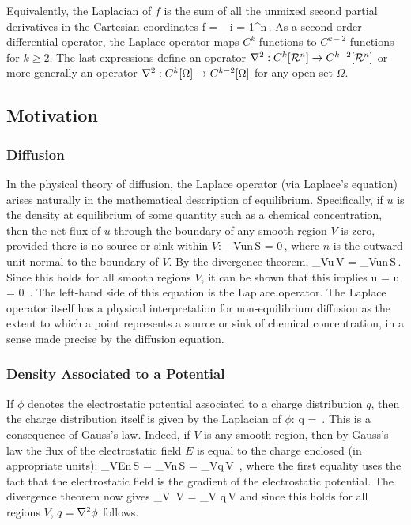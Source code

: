 Equivalently, the Laplacian of $f$ is the sum of all the unmixed second partial derivatives in the Cartesian coordinates  
\beq
\lder f = \sum_{i = 1}^{n}\,.
\eeq
As a second-order differential operator, the Laplace operator maps $C^k$-functions to $C^{k-2}$-functions for $k\geq 2$. The last expressions define an operator ${\nabla^2}:{C^k\!\left[{\mathcal{R}^{n}}\right]}\to{C^{k-2}\!\left[{\mathcal{R}^{n}}\right]}$ or more generally an operator ${\nabla^2}:{C^k\!\left[{\Omega}\right]}\to{C^{k-2}\!\left[{\Omega}\right]}$ for any open set $\Omega$.


\subsection{Motivation}

\subsubsection{Diffusion}
In the physical theory of diffusion, the Laplace operator (via Laplace's equation) arises naturally in the mathematical description of equilibrium. Specifically, if $u$ is the density at equilibrium of some quantity such as a chemical concentration, then the net flux of $u$ through the boundary of any smooth region $V$ is zero, provided there is no source or sink within $V$:
\beq
\int_{\bound V}\gder u\iprod n\,\dx S = 0\,,
\eeq
where $n$ is the outward unit normal to the boundary of $V$. By the divergence theorem,
\beq
\int_{V}\div\gder u\,\dx V = \int_{\bound V}\gder u\iprod n\,\dx S\,.
\eeq
Since this holds for all smooth regions $V$, it can be shown that this implies
\beq
\div\gder u = \lder u = 0 \,.
\eeq
The left-hand side of this equation is the Laplace operator. The Laplace operator itself has a physical interpretation for non-equilibrium diffusion as the extent to which a point represents a source or sink of chemical concentration, in a sense made precise by the diffusion equation.


\subsubsection{Density Associated to a Potential}
If $\phi$ denotes the electrostatic potential associated to a charge distribution $q$, then the charge distribution itself is given by the Laplacian of $\phi$:
\beq
q = \lder\phi\,.
\eeq
This is a consequence of Gauss's law. Indeed, if $V$ is any smooth region, then by Gauss's law the flux of the electrostatic field $E$ is equal to the charge enclosed (in appropriate units):
\beq
\int_{\bound V}E\iprod n\,\dx S = \int_{\bound V}\grad\phi\iprod n\,\dx S = \int_{V}q\,\dx V \,,
\eeq
where the first equality uses the fact that the electrostatic field is the gradient of the electrostatic potential. The divergence theorem now gives
\beq
\int_V \lder\phi\,\dx V = \int_V q\,\dx V
\eeq
and since this holds for all regions $V$, $q = \nabla^2\phi$ follows.

